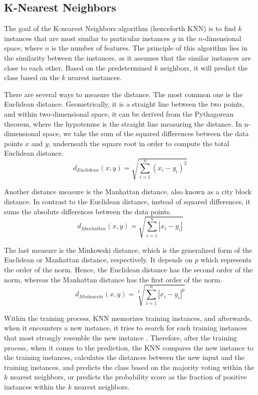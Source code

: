 \subsection{K-Nearest Neighbors}
\label{subsec:knn-theory}

The goal of the K-nearest Neighbors algorithm (henceforth KNN) is to find $k$ instances that are most similar to particular instances $y$ in the $n$-dimensional space, where $n$ is the number of features.
The principle of this algorithm lies in the similarity between the instances, as it assumes that the similar instances are close to each other.
Based on the predetermined $k$ neighbors, it will predict the class based on the $k$ nearest instances.



There are several ways to measure the distance. The most common one is the Euclidean distance. Geometrically, it is a straight line between the two points, and within two-dimensional space, it can be derived from the Pythagorean theorem, where the hypotenuse is the straight line measuring the distance. In n-dimensional space, we take the sum of the squared differences between the data points $x$ and $y$, underneath the square root in order to compute the total Euclidean distance.
\begin{equation}\label{eq}
d_{Euclidean}(x,y) = \sqrt{\sum\limits_{i=1}^{n} (x_i - y_i)^2}
\end{equation}

Another distance measure is the Manhattan distance, also known as a city block distance.
In contrast to the Euclidean distance, instead of squared differences, it sums the absolute differences between the data points.
\begin{equation}\label{eq}
d_{Manhattan}(x,y) = \sqrt{\sum\limits_{i=1}^{n} |x_i - y_i|}
\end{equation}

The last measure is the Minkowski distance, which is the generalized form of the Euclidean or Manhattan distance, respectively.
It depends on $p$ which represents the order of the norm. Hence, the Euclidean distance has the second order of the norm, whereas the Manhattan distance has the first order of the norm.
\begin{equation}\label{eq}
d_{Minkowski}(x,y) = \sqrt[p]{\sum\limits_{i=1}^{n} |x_i - y_i|^p}
\end{equation}

Within the training process, KNN memorizes training instances, and afterwards, when it encounters a new instance, it tries to search for such training instances that most strongly resemble the new instance \citep{witten2011data}.
Therefore, after the training process, when it comes to the prediction, the KNN compares the new instance to the training instances, calculates the distances between the new input and the training instances, and predicts the class based on the majority voting within the $k$ nearest neighbors, or predicts the probability score as the fraction of positive instances within the $k$ nearest neighbors.



